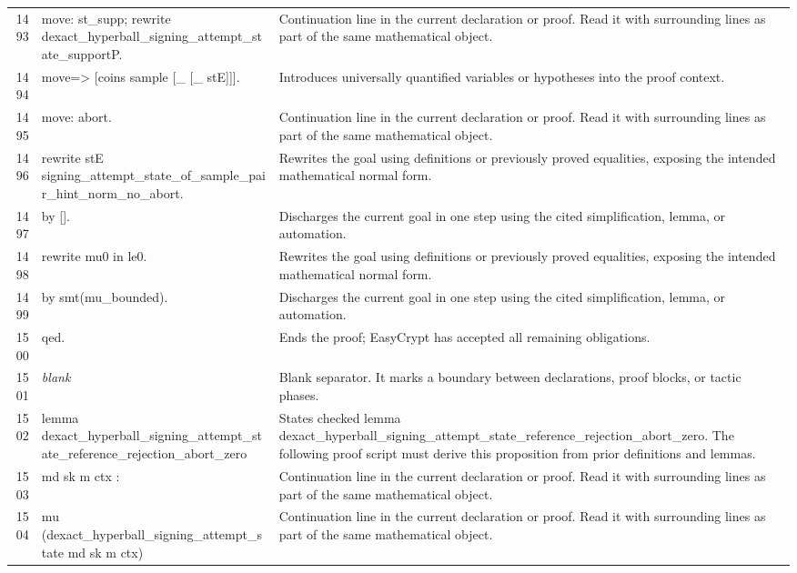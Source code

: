 \documentclass[10pt]{article}
\begin{document}
\begin{longtable}{r L{0.53\textwidth} L{0.37\textwidth}}
1493 & {\ttfamily\scriptsize   move: st\_supp; rewrite dexact\_hyperball\_signing\_attempt\_state\_supportP.} & Continuation line in the current declaration or proof.  Read it with surrounding lines as part of the same mathematical object. \\
1494 & {\ttfamily\scriptsize   move=> [coins sample [\_ [\_ stE]]].} & Introduces universally quantified variables or hypotheses into the proof context. \\
1495 & {\ttfamily\scriptsize   move: abort.} & Continuation line in the current declaration or proof.  Read it with surrounding lines as part of the same mathematical object. \\
1496 & {\ttfamily\scriptsize   rewrite stE signing\_attempt\_state\_of\_sample\_pair\_hint\_norm\_no\_abort.} & Rewrites the goal using definitions or previously proved equalities, exposing the intended mathematical normal form. \\
1497 & {\ttfamily\scriptsize   by [].} & Discharges the current goal in one step using the cited simplification, lemma, or automation. \\
1498 & {\ttfamily\scriptsize rewrite mu0 in le0.} & Rewrites the goal using definitions or previously proved equalities, exposing the intended mathematical normal form. \\
1499 & {\ttfamily\scriptsize by smt(mu\_bounded).} & Discharges the current goal in one step using the cited simplification, lemma, or automation. \\
1500 & {\ttfamily\scriptsize qed.} & Ends the proof; EasyCrypt has accepted all remaining obligations. \\
1501 & {\ttfamily\scriptsize \emph{blank}} & Blank separator.  It marks a boundary between declarations, proof blocks, or tactic phases. \\
1502 & {\ttfamily\scriptsize lemma dexact\_hyperball\_signing\_attempt\_state\_reference\_rejection\_abort\_zero} & States checked lemma dexact\_hyperball\_signing\_attempt\_state\_reference\_rejection\_abort\_zero.  The following proof script must derive this proposition from prior definitions and lemmas. \\
1503 & {\ttfamily\scriptsize   md sk m ctx :} & Continuation line in the current declaration or proof.  Read it with surrounding lines as part of the same mathematical object. \\
1504 & {\ttfamily\scriptsize   mu (dexact\_hyperball\_signing\_attempt\_state md sk m ctx)} & Continuation line in the current declaration or proof.  Read it with surrounding lines as part of the same mathematical object. \\

\end{longtable}
\end{document}
